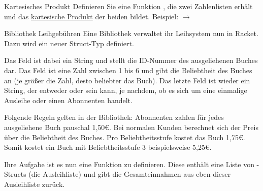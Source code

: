 \documentclass{../tuda-exercise}
\begin{document}
  \clearpagesolution

  \begin{task}[credit=\stars{2}{3}]{Kartesisches Produkt}
    Definieren Sie eine Funktion , die zwei Zahlenlisten erhält und das
    \href{https://de.wikipedia.org/wiki/Kartesisches_Produkt}{kartesische Produkt} der beiden bildet. Beispiel:
    \newline
     \(\rightarrow\)

    \begin{solution}
      
    \end{solution}
  \end{task}

  \clearpage

  \begin{task}[credit=\stars{3}{3}]{Bibliothek Leihgebühren}
    Eine Bibliothek verwaltet ihr Leihsystem nun in Racket. Dazu wird ein neuer Struct-Typ
     definiert.

    

    Das Feld  ist dabei ein String und stellt die ID-Nummer des ausgeliehenen
    Buches dar. Das Feld  ist eine Zahl zwischen 1 bis 6 und gibt die
    Beliebtheit des Buches an (je größer die Zahl, desto beliebter das Buch). Das letzte Feld
     ist wieder ein String, der entweder
    \code{\textcolor{stringcolor}{"'Single"'}} oder \code{\textcolor{stringcolor}{"'Subscription"'}}
    sein kann, je nachdem, ob es sich um eine einmalige Ausleihe oder einen Abonnenten handelt.

    \br

    Folgende Regeln gelten in der Bibliothek: Abonnenten zahlen für jedes ausgeliehene Buch
    pauschal 1,50€. Bei normalen Kunden berechnet sich der Preis über die Beliebtheit des Buches.
    Pro Beliebtheitsstufe kostet das Buch 1,75€. Somit kostet ein Buch mit Beliebtheitsstufe 3
    beispielsweise 5,25€.

    \br

    Ihre Aufgabe ist es nun eine Funktion  zu definieren. Diese enthält
    eine Liste von -Structs (die Ausleihliste) und gibt die Gesamteinnahmen aus
    eben dieser Ausleihliste zurück.

    \begin{solution}
      
    \end{solution}
  \end{task}
\end{document}
